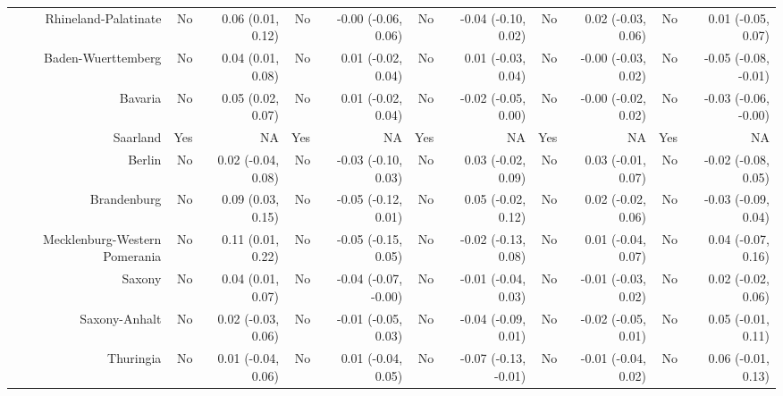 \documentclass[
  man,floatsintext]{apa6}
\newenvironment{lltable}{\begin{landscape}\centering\begin{ThreePartTable}}{\end{ThreePartTable}\end{landscape}}
\begin{document}
\begin{lltable}
{\begin{longtable}{rrrrrrrrrrr}
Rhineland-Palatinate & No & 0.06 (0.01, 0.12) & No & -0.00 (-0.06, 0.06) & No & -0.04 (-0.10, 0.02) & No & 0.02 (-0.03, 0.06) & No & 0.01 (-0.05, 0.07)\\
Baden-Wuerttemberg & No & 0.04 (0.01, 0.08) & No & 0.01 (-0.02, 0.04) & No & 0.01 (-0.03, 0.04) & No & -0.00 (-0.03, 0.02) & No & -0.05 (-0.08, -0.01)\\
Bavaria & No & 0.05 (0.02, 0.07) & No & 0.01 (-0.02, 0.04) & No & -0.02 (-0.05, 0.00) & No & -0.00 (-0.02, 0.02) & No & -0.03 (-0.06, -0.00)\\
Saarland & Yes & NA & Yes & NA & Yes & NA & Yes & NA & Yes & NA\\
Berlin & No & 0.02 (-0.04, 0.08) & No & -0.03 (-0.10, 0.03) & No & 0.03 (-0.02, 0.09) & No & 0.03 (-0.01, 0.07) & No & -0.02 (-0.08, 0.05)\\
Brandenburg & No & 0.09 (0.03, 0.15) & No & -0.05 (-0.12, 0.01) & No & 0.05 (-0.02, 0.12) & No & 0.02 (-0.02, 0.06) & No & -0.03 (-0.09, 0.04)\\
Mecklenburg-Western Pomerania & No & 0.11 (0.01, 0.22) & No & -0.05 (-0.15, 0.05) & No & -0.02 (-0.13, 0.08) & No & 0.01 (-0.04, 0.07) & No & 0.04 (-0.07, 0.16)\\
Saxony & No & 0.04 (0.01, 0.07) & No & -0.04 (-0.07, -0.00) & No & -0.01 (-0.04, 0.03) & No & -0.01 (-0.03, 0.02) & No & 0.02 (-0.02, 0.06)\\
Saxony-Anhalt & No & 0.02 (-0.03, 0.06) & No & -0.01 (-0.05, 0.03) & No & -0.04 (-0.09, 0.01) & No & -0.02 (-0.05, 0.01) & No & 0.05 (-0.01, 0.11)\\
Thuringia & No & 0.01 (-0.04, 0.06) & No & 0.01 (-0.04, 0.05) & No & -0.07 (-0.13, -0.01) & No & -0.01 (-0.04, 0.02) & No & 0.06 (-0.01, 0.13)\\
\bottomrule
\end{longtable}

}

\end{lltable}
\end{document}
